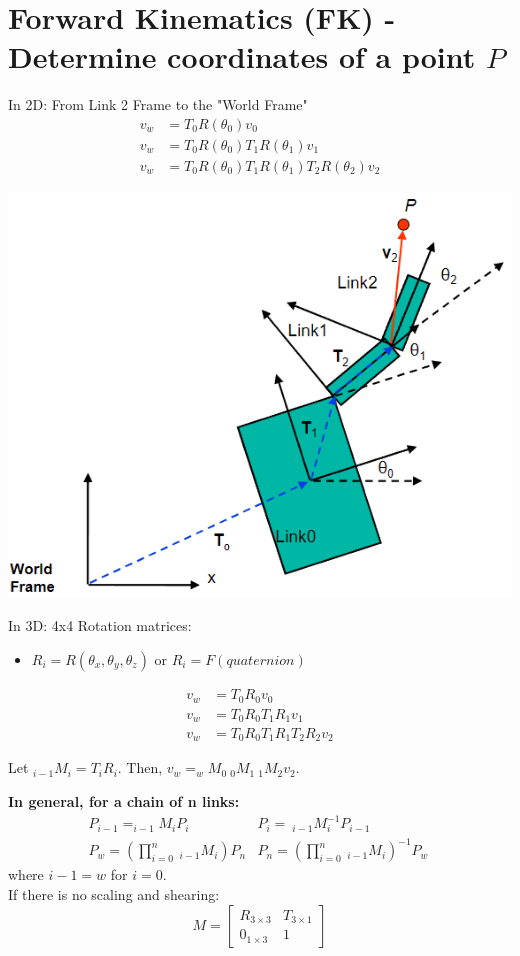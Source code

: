 \documentclass{article}
\begin{document}
\section*{Forward Kinematics (FK) - Determine coordinates of a point $P$}
In 2D: From Link 2 Frame to the "World Frame"
\begin{align*}
    v_w &= T_0 R(\theta_0) v_0\\
    v_w &= T_0 R(\theta_0) T_1 R (\theta_1) v_1\\
    v_w &= T_0 R(\theta_0) T_1 R (\theta_1) T_2 R (\theta_2) v_2
\end{align*}
\begin{center}
    \includegraphics*[scale=0.5]{W7_12.png}
\end{center}

In 3D: 4x4 Rotation matrices:
\begin{itemize}
    \item $R_i = R(\theta_x, \theta_y, \theta_z)$ or $R_i = F(quaternion)$
\end{itemize}
\begin{align*}
    v_w &= T_0 R_0 v_0\\
    v_w &= T_0 R_0 T_1 R_1 v_1\\
    v_w &= T_0 R_0 T_1 R_1 T_2 R_2 v_2
\end{align*}

Let $_{i - 1}M_i = T_i R_i$.  Then, $v_w = _w M_0 \:_0M_1 \:_1M_2 v_2$.

\textbf{In general, for a chain of n links:}
\begin{align*}
    &P_{i - 1} = _{i - 1}M_i P_i &P_i = \:_{i - 1}M^{-1}_i P_{i - 1} &\:\\
    &P_w = \left(\prod_{i = 0}^n \:_{i - 1} M_i\right) P_n &P_n = \left(\prod_{i = 0}^n \:_{i - 1} M_i\right)^{-1} P_w &\:
\end{align*}
where $i - 1 = w$ for $i = 0$.\\
If there is no scaling and shearing:
\[M = \begin{bmatrix}R_{3 \times 3} & T_{3 \times 1} \\ 0_{1 \times 3} & 1\end{bmatrix}\]
\end{document}
